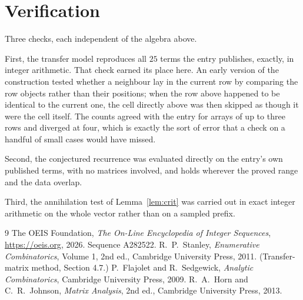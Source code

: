 \documentclass[11pt,a4paper]{article}
\theoremstyle{plain}
\theoremstyle{definition}
\begin{document}
\section{Verification}

Three checks, each independent of the algebra above.

First, the transfer model reproduces all $25$ terms the entry publishes, exactly, in
integer arithmetic. That check earned its place here. An early version of the construction
tested whether a neighbour lay in the current row by comparing the row objects rather
than their positions; when the row above happened to be identical to the current one, the
cell directly above was then skipped as though it were the cell itself. The counts agreed with
the entry for arrays of up to three rows and diverged at four, which is exactly the sort of
error that a check on a handful of small cases would have missed.

Second, the conjectured recurrence was evaluated directly on the entry's own published terms,
with no matrices involved, and holds wherever the proved range and the data overlap.

Third, the annihilation test of Lemma~\ref{lem:crit} was carried out in exact integer
arithmetic on the whole vector rather than on a sampled prefix.

\begin{thebibliography}{9}
 The OEIS Foundation, \emph{The On-Line Encyclopedia of Integer
Sequences}, \url{https://oeis.org}, 2026. Sequence A282522.
 R.~P.~Stanley, \emph{Enumerative Combinatorics}, Volume 1, 2nd ed.,
Cambridge University Press, 2011. (Transfer-matrix method, Section 4.7.)
 P.~Flajolet and R.~Sedgewick, \emph{Analytic Combinatorics}, Cambridge
University Press, 2009.
 R.~A.~Horn and C.~R.~Johnson, \emph{Matrix Analysis}, 2nd ed., Cambridge
University Press, 2013.
\end{thebibliography}
\end{document}
